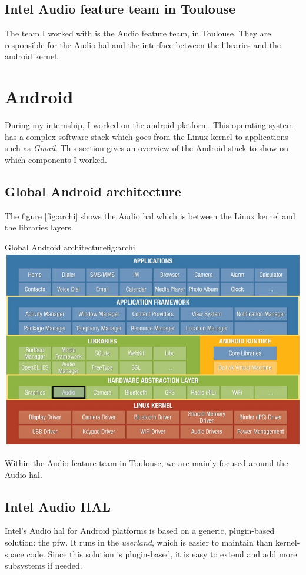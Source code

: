 \subsection{Intel Audio feature team in Toulouse}
The team I worked with is the Audio feature team, in Toulouse.
They are responsible for the Audio \gls{hal} and the interface between the
libraries and the \gls{android} \gls{kernel}.


\section{Android}
During my internship, I worked on the \gls{android} platform. This operating
system has a complex software stack which goes from the Linux \gls{kernel} to
applications such as \emph{Gmail}. This section gives an overview of the Android
stack to show on which components I worked.

\subsection{Global Android architecture}

The figure \ref{fig:archi} shows the Audio \gls{hal} which is between the
Linux \gls{kernel} and the libraries layers.
\begin{figureGraphics}{Global Android architecture}{fig:archi}
\includegraphics[width=\textwidth]{./src/img/android-archi-audio-hal.jpeg}
\end{figureGraphics}

Within the Audio feature team in Toulouse, we are mainly focused around the Audio \gls{hal}.

\subsection{Intel Audio HAL}
Intel's Audio \gls{hal} for Android platforms is based on a generic, plugin-based solution: the \gls{pfw}.
It runs in the \emph{userland}, which is easier to maintain than kernel-space code.
Since this solution is plugin-based, it is easy to extend and add more subsystems if needed.

